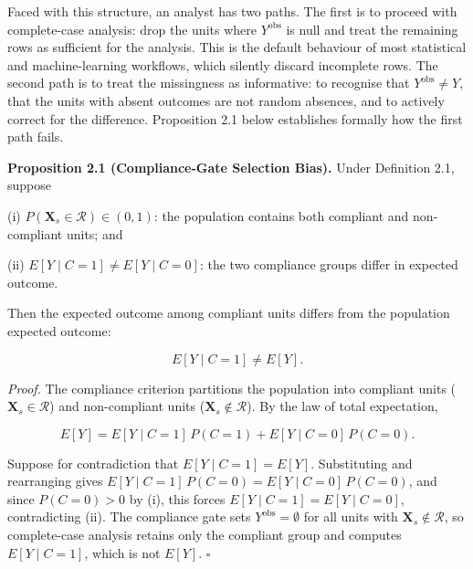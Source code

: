 Faced with this structure, an analyst has two paths. The first is to proceed with complete-case analysis: drop the units where $Y^{\text{obs}}$ is null and treat the remaining rows as sufficient for the analysis. This is the default behaviour of most statistical and machine-learning workflows, which silently discard incomplete rows. The second path is to treat the missingness as informative: to recognise that $Y^{\text{obs}} \neq Y$, that the units with absent outcomes are not random absences, and to actively correct for the difference. Proposition 2.1 below establishes formally how the first path fails. 

\textbf{Proposition 2.1 (Compliance-Gate Selection Bias).} Under Definition 2.1, suppose

(i) $P(\mathbf{X}_s \in \mathcal{R}) \in (0,1)$: the population contains both compliant and non-compliant units; and

(ii) $E[Y \mid C = 1] \neq E[Y \mid C = 0]$: the two compliance groups differ in expected outcome.

Then the expected outcome among compliant units differs from the population expected outcome:

\[
E[Y \mid C = 1] \neq E[Y].
\]

\textit{Proof.} The compliance criterion partitions the population into compliant units ($\mathbf{X}_s \in \mathcal{R}$) and non-compliant units ($\mathbf{X}_s \notin \mathcal{R}$). By the law of total expectation,

\[
E[Y] = E[Y \mid C = 1]\, P(C = 1) + E[Y \mid C = 0]\, P(C = 0).
\]

Suppose for contradiction that $E[Y \mid C = 1] = E[Y]$. Substituting and rearranging gives $E[Y \mid C = 1]\, P(C = 0) = E[Y \mid C = 0]\, P(C = 0)$, and since $P(C = 0) > 0$ by (i), this forces $E[Y \mid C = 1] = E[Y \mid C = 0]$, contradicting (ii). The compliance gate sets $Y^{\text{obs}} = \emptyset$ for all units with $\mathbf{X}_s \notin \mathcal{R}$, so complete-case analysis retains only the compliant group and computes $E[Y \mid C = 1]$, which is not $E[Y]$. $\square$


